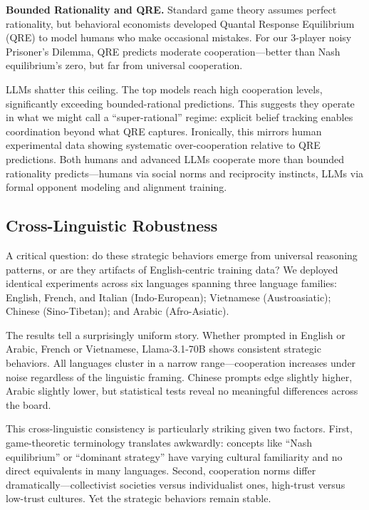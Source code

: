 \documentclass{uai2026} %
\begin{document}
\textbf{Bounded Rationality and QRE.} Standard game theory assumes perfect rationality, but behavioral economists developed Quantal Response Equilibrium (QRE) \citep{mckelvey1998quantal} to model humans who make occasional mistakes. For our 3-player noisy Prisoner's Dilemma, QRE predicts moderate cooperation---better than Nash equilibrium's zero, but far from universal cooperation.

LLMs shatter this ceiling. The top models reach high cooperation levels, significantly exceeding bounded-rational predictions. This suggests they operate in what we might call a ``super-rational'' regime: explicit belief tracking enables coordination beyond what QRE captures. Ironically, this mirrors human experimental data showing systematic over-cooperation relative to QRE predictions. Both humans and advanced LLMs cooperate more than bounded rationality predicts---humans via social norms and reciprocity instincts, LLMs via formal opponent modeling and alignment training.

\subsection{Cross-Linguistic Robustness}

A critical question: do these strategic behaviors emerge from universal reasoning patterns, or are they artifacts of English-centric training data? We deployed identical experiments across six languages spanning three language families: English, French, and Italian (Indo-European); Vietnamese (Austroasiatic); Chinese (Sino-Tibetan); and Arabic (Afro-Asiatic).

The results tell a surprisingly uniform story. Whether prompted in English or Arabic, French or Vietnamese, Llama-3.1-70B shows consistent strategic behaviors. All languages cluster in a narrow range---cooperation increases under noise regardless of the linguistic framing. Chinese prompts edge slightly higher, Arabic slightly lower, but statistical tests reveal no meaningful differences across the board.

This cross-linguistic consistency is particularly striking given two factors. First, game-theoretic terminology translates awkwardly: concepts like ``Nash equilibrium'' or ``dominant strategy'' have varying cultural familiarity and no direct equivalents in many languages. Second, cooperation norms differ dramatically---collectivist societies versus individualist ones, high-trust versus low-trust cultures. Yet the strategic behaviors remain stable.
\end{document}
